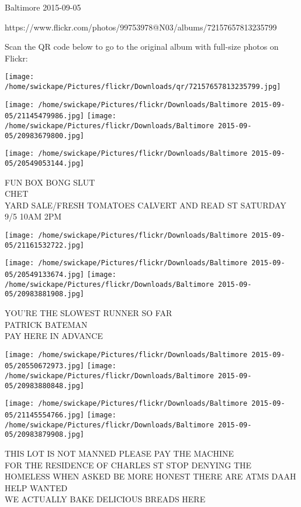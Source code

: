 \documentclass[10pt,letterpaper]{article}
\begin{document}
Baltimore 2015-09-05

https://www.flickr.com/photos/99753978@N03/albums/72157657813235799

Scan the QR code below to go to the original album with full-size photos on Flickr:

\texttt{[image: /home/swickape/Pictures/flickr/Downloads/qr/72157657813235799.jpg]}
\pagebreak

\texttt{[image: /home/swickape/Pictures/flickr/Downloads/Baltimore 2015-09-05/21145479986.jpg]}
\texttt{[image: /home/swickape/Pictures/flickr/Downloads/Baltimore 2015-09-05/20983679800.jpg]}

\texttt{[image: /home/swickape/Pictures/flickr/Downloads/Baltimore 2015-09-05/20549053144.jpg]}

FUN BOX BONG SLUT\\
CHET\\
YARD SALE/FRESH TOMATOES CALVERT AND READ ST SATURDAY 9/5 10AM 2PM\\
\pagebreak

\texttt{[image: /home/swickape/Pictures/flickr/Downloads/Baltimore 2015-09-05/21161532722.jpg]}

\vspace{0.25in}
\texttt{[image: /home/swickape/Pictures/flickr/Downloads/Baltimore 2015-09-05/20549133674.jpg]}
\texttt{[image: /home/swickape/Pictures/flickr/Downloads/Baltimore 2015-09-05/20983881908.jpg]}

YOU'RE THE SLOWEST RUNNER SO FAR\\
PATRICK BATEMAN\\
PAY HERE IN ADVANCE\\
\pagebreak

\texttt{[image: /home/swickape/Pictures/flickr/Downloads/Baltimore 2015-09-05/20550672973.jpg]}
\texttt{[image: /home/swickape/Pictures/flickr/Downloads/Baltimore 2015-09-05/20983880848.jpg]}

\texttt{[image: /home/swickape/Pictures/flickr/Downloads/Baltimore 2015-09-05/21145554766.jpg]}
\texttt{[image: /home/swickape/Pictures/flickr/Downloads/Baltimore 2015-09-05/20983879908.jpg]}

THIS LOT IS NOT MANNED PLEASE PAY THE MACHINE\\
FOR THE RESIDENCE OF CHARLES ST STOP DENYING THE HOMELESS WHEN ASKED BE MORE HONEST THERE ARE ATMS DAAH\\
HELP WANTED\\
WE ACTUALLY BAKE DELICIOUS BREADS HERE\\
\pagebreak
\end{document}

